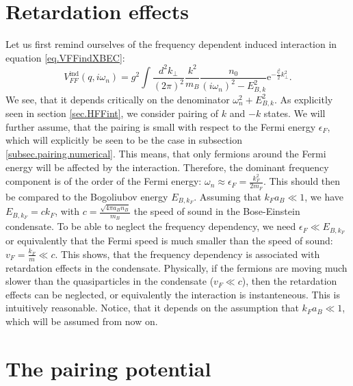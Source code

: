 \section{Retardation effects} \label{sec.RetardationEffects}
Let us first remind ourselves of the frequency dependent induced interaction in equation \eqref{eq.VFFindXBEC}:
\begin{equation}
V_{FF}^\text{ind}(q,i\omega_n) = g^2\int\frac{d^2k_\perp}{(2\pi)^2}\frac{k^2}{m_B}\frac{n_0}{(i\omega_n)^2-E_{B,k}^2}\text{e}^{-\frac{l_t^2}{2}k_\perp^2}. \nonumber
\end{equation}
We see, that it depends critically on the denominator $\omega_n^2+E_{B,k}^2$. As explicitly seen in section \ref{sec.HFFint}, we consider pairing of $k$ and $-k$ states. We will further assume, that the pairing is small with respect to the Fermi energy $\epsilon_F$, which will explicitly be seen to be the case in subsection \ref{subsec.pairing.numerical}. This means, that only fermions around the Fermi energy will be affected by the interaction. Therefore, the dominant frequency component is of the order of the Fermi energy: $\omega_n \approx \epsilon_F = \frac{k_F^2}{2m_F}$. This should then be compared to the Bogoliubov energy $E_{B,k_F}$. Assuming that $k_Fa_B\ll 1$, we have $E_{B,k_F} = ck_F$, with $c =\frac{\sqrt{4\pi a_B n_B}}{m_B}$ the speed of sound in the Bose-Einstein condensate. To be able to neglect the frequency dependency, we need $\epsilon_F \ll E_{B,k_F}$ or equivalently that the Fermi speed is much smaller than the speed of sound: $v_F = \frac{k_F}{m}\ll c$. This shows, that the frequency dependency is associated with retardation effects in the condensate. Physically, if the fermions are moving much slower than the quasiparticles in the condensate ($v_F \ll c$), then the retardation effects can be neglected, or equivalently the interaction is instanteneous. This is intuitively reasonable. Notice, that it depends on the assumption that $k_Fa_B\ll 1$, which will be assumed from now on.

\section{The pairing potential} \label{sec.pairingpotential}
